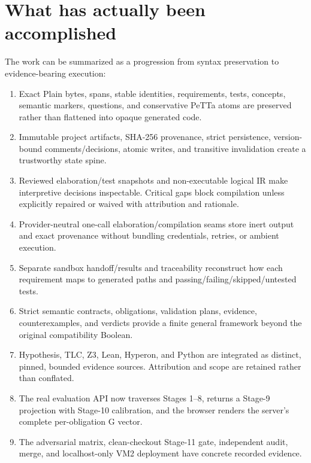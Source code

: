 \documentclass[11pt]{article}
\begin{document}
\section{What has actually been accomplished}

The work can be summarized as a progression from syntax preservation to
evidence-bearing execution:

\begin{enumerate}
\item Exact Plain bytes, spans, stable identities, requirements, tests,
      concepts, semantic markers, questions, and conservative PeTTa atoms are
      preserved rather than flattened into opaque generated code.
\item Immutable project artifacts, SHA-256 provenance, strict persistence,
      version-bound comments/decisions, atomic writes, and transitive
      invalidation create a trustworthy state spine.
\item Reviewed elaboration/test snapshots and non-executable logical IR make
      interpretive decisions inspectable.  Critical gaps block compilation
      unless explicitly repaired or waived with attribution and rationale.
\item Provider-neutral one-call elaboration/compilation seams store inert
      output and exact provenance without bundling credentials, retries, or
      ambient execution.
\item Separate sandbox handoff/results and traceability reconstruct how each
      requirement maps to generated paths and passing/failing/skipped/untested
      tests.
\item Strict semantic contracts, obligations, validation plans, evidence,
      counterexamples, and verdicts provide a finite general framework beyond
      the original compatibility Boolean.
\item Hypothesis, TLC, Z3, Lean, Hyperon, and Python are integrated as
      distinct, pinned, bounded evidence sources.  Attribution and scope are
      retained rather than conflated.
\item The real evaluation API now traverses Stages 1--8, returns a Stage-9
      projection with Stage-10 calibration, and the browser renders the
      server's complete per-obligation G vector.
\item The adversarial matrix, clean-checkout Stage-11 gate, independent audit,
      merge, and localhost-only VM2 deployment have concrete recorded evidence.
\end{enumerate}
\end{document}
